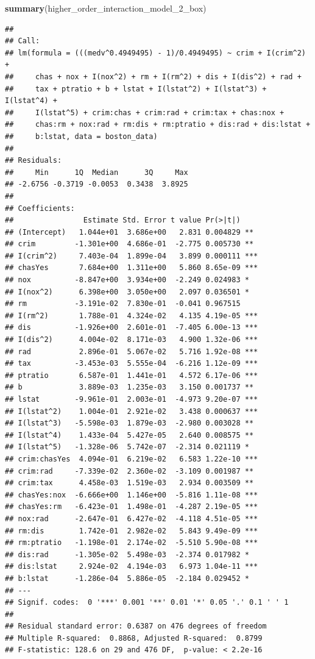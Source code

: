 \documentclass[
]{article}
\newenvironment{Shaded}{\begin{snugshade}}{\end{snugshade}}
\newcommand{\FunctionTok}[1]{\textcolor[rgb]{0.13,0.29,0.53}{\textbf{#1}}}
\newcommand{\NormalTok}[1]{#1}
\begin{document}
\begin{Shaded}
\begin{Highlighting}[]
\FunctionTok{summary}\NormalTok{(higher\_order\_interaction\_model\_2\_box)}
\end{Highlighting}
\end{Shaded}

\begin{verbatim}
## 
## Call:
## lm(formula = (((medv^0.4949495) - 1)/0.4949495) ~ crim + I(crim^2) + 
##     chas + nox + I(nox^2) + rm + I(rm^2) + dis + I(dis^2) + rad + 
##     tax + ptratio + b + lstat + I(lstat^2) + I(lstat^3) + I(lstat^4) + 
##     I(lstat^5) + crim:chas + crim:rad + crim:tax + chas:nox + 
##     chas:rm + nox:rad + rm:dis + rm:ptratio + dis:rad + dis:lstat + 
##     b:lstat, data = boston_data)
## 
## Residuals:
##     Min      1Q  Median      3Q     Max 
## -2.6756 -0.3719 -0.0053  0.3438  3.8925 
## 
## Coefficients:
##                Estimate Std. Error t value Pr(>|t|)    
## (Intercept)   1.044e+01  3.686e+00   2.831 0.004829 ** 
## crim         -1.301e+00  4.686e-01  -2.775 0.005730 ** 
## I(crim^2)     7.403e-04  1.899e-04   3.899 0.000111 ***
## chasYes       7.684e+00  1.311e+00   5.860 8.65e-09 ***
## nox          -8.847e+00  3.934e+00  -2.249 0.024983 *  
## I(nox^2)      6.398e+00  3.050e+00   2.097 0.036501 *  
## rm           -3.191e-02  7.830e-01  -0.041 0.967515    
## I(rm^2)       1.788e-01  4.324e-02   4.135 4.19e-05 ***
## dis          -1.926e+00  2.601e-01  -7.405 6.00e-13 ***
## I(dis^2)      4.004e-02  8.171e-03   4.900 1.32e-06 ***
## rad           2.896e-01  5.067e-02   5.716 1.92e-08 ***
## tax          -3.453e-03  5.555e-04  -6.216 1.12e-09 ***
## ptratio       6.587e-01  1.441e-01   4.572 6.17e-06 ***
## b             3.889e-03  1.235e-03   3.150 0.001737 ** 
## lstat        -9.961e-01  2.003e-01  -4.973 9.20e-07 ***
## I(lstat^2)    1.004e-01  2.921e-02   3.438 0.000637 ***
## I(lstat^3)   -5.598e-03  1.879e-03  -2.980 0.003028 ** 
## I(lstat^4)    1.433e-04  5.427e-05   2.640 0.008575 ** 
## I(lstat^5)   -1.328e-06  5.742e-07  -2.314 0.021119 *  
## crim:chasYes  4.094e-01  6.219e-02   6.583 1.22e-10 ***
## crim:rad     -7.339e-02  2.360e-02  -3.109 0.001987 ** 
## crim:tax      4.458e-03  1.519e-03   2.934 0.003509 ** 
## chasYes:nox  -6.666e+00  1.146e+00  -5.816 1.11e-08 ***
## chasYes:rm   -6.423e-01  1.498e-01  -4.287 2.19e-05 ***
## nox:rad      -2.647e-01  6.427e-02  -4.118 4.51e-05 ***
## rm:dis        1.742e-01  2.982e-02   5.843 9.49e-09 ***
## rm:ptratio   -1.198e-01  2.174e-02  -5.510 5.90e-08 ***
## dis:rad      -1.305e-02  5.498e-03  -2.374 0.017982 *  
## dis:lstat     2.924e-02  4.194e-03   6.973 1.04e-11 ***
## b:lstat      -1.286e-04  5.886e-05  -2.184 0.029452 *  
## ---
## Signif. codes:  0 '***' 0.001 '**' 0.01 '*' 0.05 '.' 0.1 ' ' 1
## 
## Residual standard error: 0.6387 on 476 degrees of freedom
## Multiple R-squared:  0.8868, Adjusted R-squared:  0.8799 
## F-statistic: 128.6 on 29 and 476 DF,  p-value: < 2.2e-16
\end{verbatim}
\end{document}
